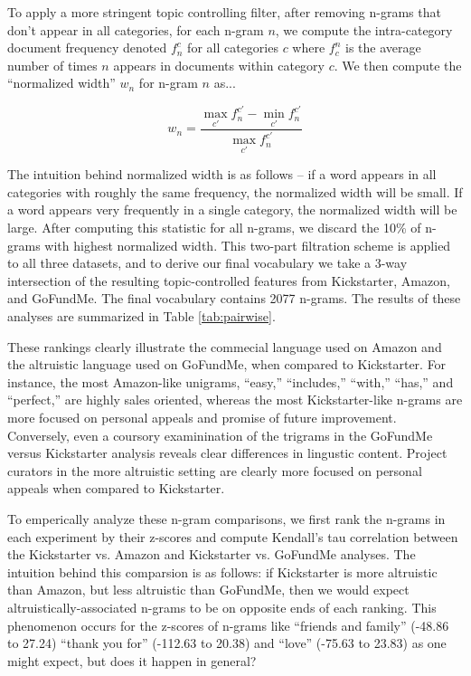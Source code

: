 \documentclass[letterpaper]{article}
\begin{document}
To apply a more stringent topic controlling filter, after removing n-grams that don't appear in all categories, for each n-gram $n$, we compute the intra-category document frequency denoted $f_n^c$ for all categories $c$ where $f^n_c$ is the average number of times $n$ appears in documents within category $c$. We then compute the ``normalized width'' $w_n$ for n-gram $n$ as...

\begin{equation} \label{eq:width}
w_n = \frac{\max\limits_{c'}f_n^{c'} - \min\limits_{c'}f_n^{c'}}{\max\limits_{c'}f_n^{c'}}
\end{equation}

The intuition behind normalized width is as follows -- if a word appears in all categories with roughly the same frequency, the normalized width will be small. If a word appears very frequently in a single category, the normalized width will be large. After computing this statistic for all n-grams, we discard the 10\% of n-grams with highest normalized width. This two-part filtration scheme is applied to all three datasets, and to derive our final vocabulary we take a 3-way intersection of the resulting topic-controlled features from Kickstarter, Amazon, and GoFundMe. The final vocabulary contains 2077 n-grams. The results of these analyses are summarized in Table \ref{tab:pairwise}.

These rankings clearly illustrate the commecial language used on Amazon and the altruistic language used on GoFundMe, when compared to Kickstarter. For instance, the most Amazon-like unigrams, ``easy,'' ``includes,'' ``with,'' ``has,'' and ``perfect,'' are highly sales oriented, whereas the most Kickstarter-like n-grams are more focused on personal appeals and promise of future improvement. Conversely, even a coursory examinination of the trigrams in the GoFundMe versus Kickstarter analysis reveals clear differences in lingustic content. Project curators in the more altruistic setting are clearly more focused on personal appeals when compared to Kickstarter.

To emperically analyze these n-gram comparisons, we first rank the n-grams in each experiment by their z-scores and compute Kendall's tau correlation between the Kickstarter vs. Amazon and Kickstarter vs. GoFundMe analyses. The intuition behind this comparsion is as follows: if Kickstarter is more altruistic than Amazon, but less altruistic than GoFundMe, then we would expect altruistically-associated n-grams to be on opposite ends of each ranking. This phenomenon occurs for the z-scores of n-grams like ``friends and family'' (-48.86 to 27.24) ``thank you for'' (-112.63 to 20.38) and ``love'' (-75.63 to 23.83) as one might expect, but does it happen in general?
\end{document}
